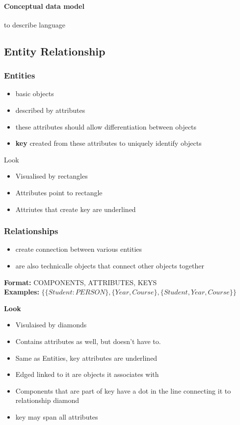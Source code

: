 \documentclass{article}
\newcommand\tab[1][0.5cm]{\hspace*{#1}}
\begin{document}
			\paragraph{Conceptual data model} to describe language

	\subsection{Entity Relationship}
		\subsubsection{Entities}
			\begin{itemize}
				\item basic objects
				\item described by attributes
				\item these attributes should allow differentiation between objects
				\item \textbf{key} created from these attributes to uniquely identify objects
			\end{itemize}

			Look
			\begin{itemize}
				\item Visualised by rectangles
				\item Attributes point to rectangle
				\item Attriutes that create key are underlined
			\end{itemize}

		\subsubsection{Relationships}
			\begin{itemize}
				\item create connection between various entities
				\item are also technicalle objects that connect other objects together
			\end{itemize}

			\tab \textbf{Format:} {COMPONENTS, ATTRIBUTES, KEYS}
			\\ \tab \tab \textbf{Examples:} $\{\{Student:PERSON\},\{Year, Course\}, \{Student, Year, Course\}\}$

			\textbf{Look}
			\begin{itemize}
				\item Visulaised by diamonds
				\item Contains attributes as well, but doesn't have to.
				\item Same as Entities, key attributes are underlined
				\item Edged linked to it are objects it associates with
				\item Components that are part of key have a dot in the line connecting it to relationship diamond
				\item key may span all attributes
			\end{itemize}
\end{document}
